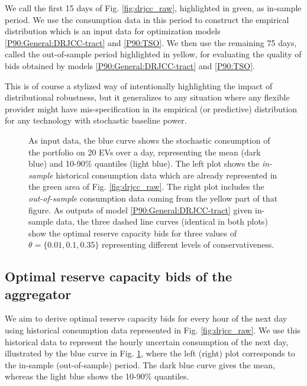 \documentclass[conference]{IEEEtran}
\begin{document}
We call the first 15 days of Fig. \ref{fig:drjcc_raw}, highlighted in green, as in-sample period. We use the consumption data in this period to construct the empirical distribution which is an input data for optimization models \eqref{P90:General:DRJCC-tract} and \eqref{P90:TSO}. We then use the remaining 75 days, called the out-of-sample period highlighted in yellow, for evaluating the quality of bids obtained by models \eqref{P90:General:DRJCC-tract} and \eqref{P90:TSO}. 



This is of course a stylized way of intentionally highlighting the impact of distributional robustness, but it generalizes to any situation where any flexible provider might have mis-specification in its empirical (or predictive) distribution for any technology with stochastic baseline power.

\begin{figure}[!t]
    \centering
    \begin{adjustbox}{width=\columnwidth}
        
    \end{adjustbox}
    \caption{\small{ As input data, the blue curve shows the stochastic consumption of the portfolio on 20 EVs over a day, representing the mean (dark blue) and 10-90\% quantiles (light blue). The left plot shows the \textit{in-sample} historical consumption data which are already represented in the green area of Fig. \ref{fig:drjcc_raw}. The right plot includes the \textit{out-of-sample} consumption data coming from the yellow part of that figure. As outputs of model \eqref{P90:General:DRJCC-tract} given in-sample data, the three dashed line curves (identical in both plots) show the optimal  reserve capacity bids for three values of $\theta = \{0.01, 0.1, 0.35\}$ representing different levels of conservativeness.}}
    \label{fig:drjcc_bids}
\end{figure}
 
\vspace{2mm}
\subsection{Optimal reserve capacity bids of the aggregator}
\vspace{-1mm}
We aim to derive optimal reserve capacity bids for every hour of the next day using historical consumption data represented in Fig. \ref{fig:drjcc_raw}. We use this historical data to represent the hourly uncertain consumption of the next day, illustrated by the blue curve in Fig. \ref{fig:drjcc_bids}, where the left (right) plot corresponds to the in-sample (out-of-sample) period. The dark blue curve gives the mean, whereas the light blue shows the 10-90\% quantiles. 
\end{document}
